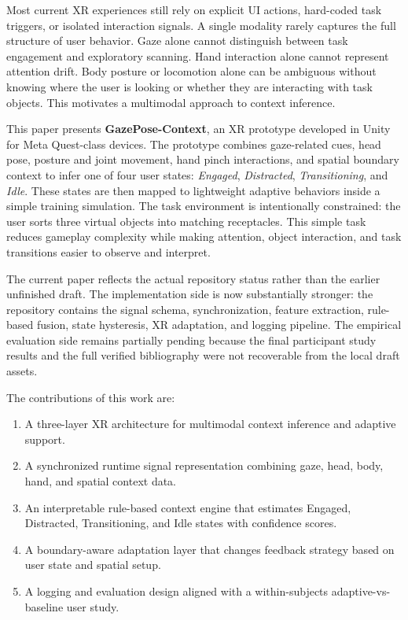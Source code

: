 \documentclass[10pt,twocolumn]{article}
\begin{document}
Most current XR experiences still rely on explicit UI actions, hard-coded task triggers, or isolated interaction signals. A single modality rarely captures the full structure of user behavior. Gaze alone cannot distinguish between task engagement and exploratory scanning. Hand interaction alone cannot represent attention drift. Body posture or locomotion alone can be ambiguous without knowing where the user is looking or whether they are interacting with task objects. This motivates a multimodal approach to context inference.

This paper presents \textbf{GazePose-Context}, an XR prototype developed in Unity for Meta Quest-class devices. The prototype combines gaze-related cues, head pose, posture and joint movement, hand pinch interactions, and spatial boundary context to infer one of four user states: \textit{Engaged}, \textit{Distracted}, \textit{Transitioning}, and \textit{Idle}. These states are then mapped to lightweight adaptive behaviors inside a simple training simulation. The task environment is intentionally constrained: the user sorts three virtual objects into matching receptacles. This simple task reduces gameplay complexity while making attention, object interaction, and task transitions easier to observe and interpret.

The current paper reflects the actual repository status rather than the earlier unfinished draft. The implementation side is now substantially stronger: the repository contains the signal schema, synchronization, feature extraction, rule-based fusion, state hysteresis, XR adaptation, and logging pipeline. The empirical evaluation side remains partially pending because the final participant study results and the full verified bibliography were not recoverable from the local draft assets.

The contributions of this work are:
\begin{enumerate}[leftmargin=1.2em]
  \item A three-layer XR architecture for multimodal context inference and adaptive support.
  \item A synchronized runtime signal representation combining gaze, head, body, hand, and spatial context data.
  \item An interpretable rule-based context engine that estimates Engaged, Distracted, Transitioning, and Idle states with confidence scores.
  \item A boundary-aware adaptation layer that changes feedback strategy based on user state and spatial setup.
  \item A logging and evaluation design aligned with a within-subjects adaptive-vs-baseline user study.
\end{enumerate}
\end{document}
